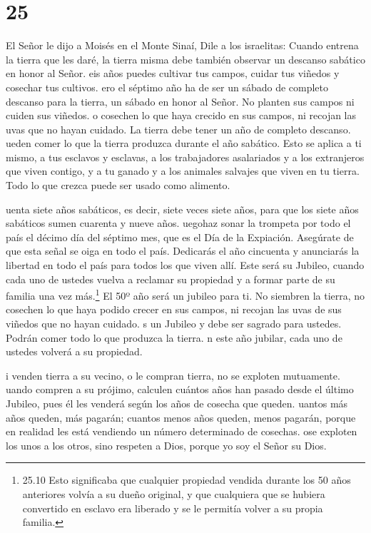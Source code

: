 \hypertarget{section-24}{%
\section{25}\label{section-24}}

 El Señor le dijo a Moisés en el Monte Sinaí, 
Dile a los israelitas: Cuando entrena la tierra que les daré, la tierra
misma debe también observar un descanso sabático en honor al Señor.
 eis años puedes cultivar tus campos, cuidar tus viñedos y
cosechar tus cultivos.  ero el séptimo año ha de ser un
sábado de completo descanso para la tierra, un sábado en honor al Señor.
No planten sus campos ni cuiden sus viñedos.  o cosechen lo
que haya crecido en sus campos, ni recojan las uvas que no hayan
cuidado. La tierra debe tener un año de completo descanso. 
ueden comer lo que la tierra produzca durante el año sabático. Esto se
aplica a ti mismo, a tus esclavos y esclavas, a los trabajadores
asalariados y a los extranjeros que viven contigo,  y a tu
ganado y a los animales salvajes que viven en tu tierra. Todo lo que
crezca puede ser usado como alimento.

 uenta siete años sabáticos, es decir, siete veces siete
años, para que los siete años sabáticos sumen cuarenta y nueve años.
 uegohaz sonar la trompeta por todo el país el décimo día
del séptimo mes, que es el Día de la Expiación. Asegúrate de que esta
señal se oiga en todo el país.  Dedicarás el año cincuenta
y anunciarás la libertad en todo el país para todos los que viven allí.
Este será su Jubileo, cuando cada uno de ustedes vuelva a reclamar su
propiedad y a formar parte de su familia una vez más.\footnote{25.10
  Esto significaba que cualquier propiedad vendida durante los 50 años
  anteriores volvía a su dueño original, y que cualquiera que se hubiera
  convertido en esclavo era liberado y se le permitía volver a su propia
  familia.}  El 50º año será un jubileo para ti. No
siembren la tierra, no cosechen lo que haya podido crecer en sus campos,
ni recojan las uvas de sus viñedos que no hayan cuidado.  s
un Jubileo y debe ser sagrado para ustedes. Podrán comer todo lo que
produzca la tierra.  n este año jubilar, cada uno de
ustedes volverá a su propiedad.

 i venden tierra a su vecino, o le compran tierra, no se
exploten mutuamente.  uando compren a su prójimo, calculen
cuántos años han pasado desde el último Jubileo, pues él les venderá
según los años de cosecha que queden.  uantos más años
queden, más pagarán; cuantos menos años queden, menos pagarán, porque en
realidad les está vendiendo un número determinado de cosechas.
 ose exploten los unos a los otros, sino respeten a Dios,
porque yo soy el Señor su Dios.

